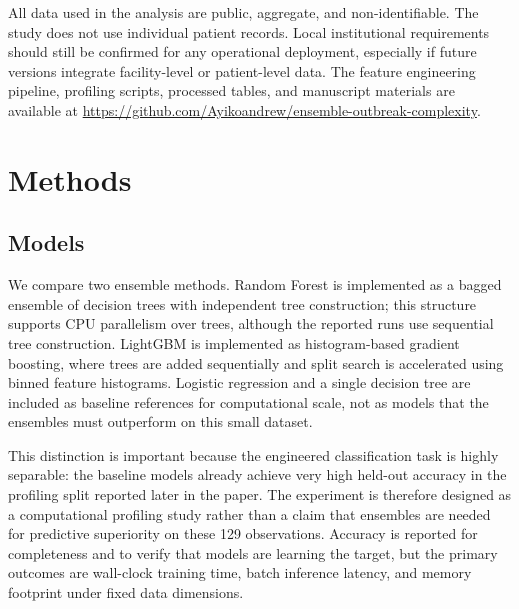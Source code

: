 \documentclass[11pt]{article}
\begin{document}
All data used in the analysis are public, aggregate, and non-identifiable. The study does not use individual patient records. Local institutional requirements should still be confirmed for any operational deployment, especially if future versions integrate facility-level or patient-level data. The feature engineering pipeline, profiling scripts, processed tables, and manuscript materials are available at \url{https://github.com/Ayikoandrew/ensemble-outbreak-complexity}.

\section{Methods}
\subsection{Models}
We compare two ensemble methods. Random Forest is implemented as a bagged ensemble of decision trees with independent tree construction; this structure supports CPU parallelism over trees, although the reported runs use sequential tree construction. LightGBM is implemented as histogram-based gradient boosting, where trees are added sequentially and split search is accelerated using binned feature histograms. Logistic regression and a single decision tree are included as baseline references for computational scale, not as models that the ensembles must outperform on this small dataset.

This distinction is important because the engineered classification task is highly separable: the baseline models already achieve very high held-out accuracy in the profiling split reported later in the paper. The experiment is therefore designed as a computational profiling study rather than a claim that ensembles are needed for predictive superiority on these 129 observations. Accuracy is reported for completeness and to verify that models are learning the target, but the primary outcomes are wall-clock training time, batch inference latency, and memory footprint under fixed data dimensions.
\end{document}
